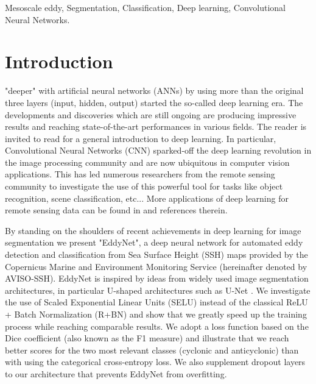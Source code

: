 \documentclass[journal]{IEEEtran}
\begin{document}
\begin{IEEEkeywords}
Mesoscale eddy, Segmentation, Classification, Deep learning, Convolutional Neural Networks.
\end{IEEEkeywords}






\IEEEpeerreviewmaketitle



\section{Introduction}
 "deeper" with artificial neural networks (ANNs) by using more than the original three layers (input, hidden, output) started the so-called deep learning era. The developments and discoveries which are still ongoing are producing impressive results and reaching state-of-the-art performances in various fields. The reader is invited to read \cite{goodfellow2016deep} for a general introduction to deep learning. In particular, Convolutional Neural Networks (CNN) sparked-off the deep learning revolution in the image processing community and are now ubiquitous in computer vision applications. This has led numerous researchers from the remote sensing community to investigate the use of this powerful tool for tasks like object recognition, scene classification, etc... More applications of deep learning for remote sensing data can be found in \cite{zhang2016deep,DLforRS} and references therein.

By standing on the shoulders of recent achievements in deep learning for image segmentation we present "EddyNet", a deep neural network for automated eddy detection and classification from Sea Surface Height (SSH) maps provided by the Copernicus Marine and Environment Monitoring Service (hereinafter denoted by AVISO-SSH). EddyNet is inspired by ideas from widely used image segmentation architectures, in particular U-shaped architectures such as U-Net \cite{ronneberger2015u}. We investigate the use of Scaled Exponential Linear Units (SELU) \cite{klambauer2017self,clevert2015fast} instead of the classical ReLU + Batch Normalization (R+BN) and show that we greatly speed up the training process while reaching comparable results. We adopt a loss function based on the Dice coefficient (also known as the F1 measure) and illustrate that we reach better scores for the two most relevant classes (cyclonic and anticyclonic) than with using the categorical cross-entropy loss. We also supplement dropout layers to our architecture that prevents EddyNet from overfitting.
\end{document}
